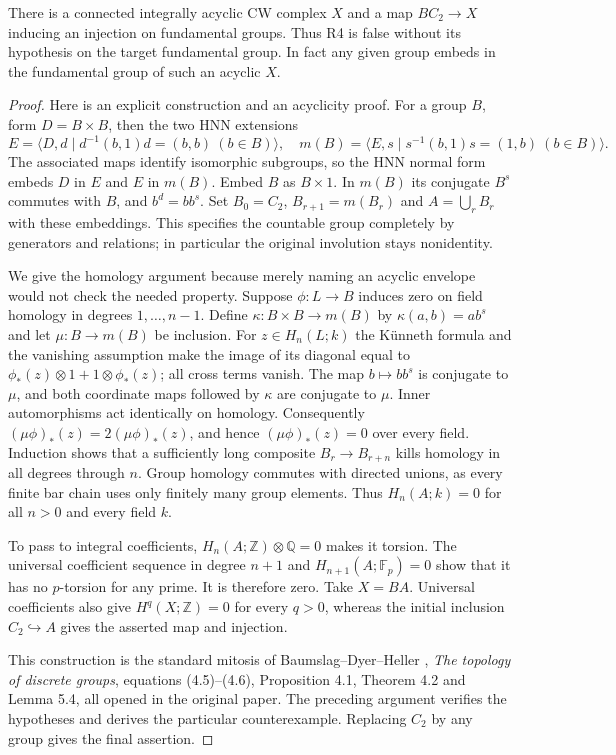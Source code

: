 \begin{theorem}\label{A:acyclic}
There is a connected integrally acyclic CW complex $X$ and a map
$BC_2\to X$ inducing an injection on fundamental groups. Thus R4 is false
without its hypothesis on the target fundamental group. In fact any given
group embeds in the fundamental group of such an acyclic $X$.
\end{theorem}
\begin{proof}
Here is an explicit construction and an acyclicity proof. For a group $B$,
form $D=B\times B$, then the two HNN extensions
\[
 E=\langle D,d\mid d^{-1}(b,1)d=(b,b)\ (b\in B)\rangle,
\quad
 m(B)=\langle E,s\mid s^{-1}(b,1)s=(1,b)\ (b\in B)\rangle.
\]
The associated maps identify isomorphic subgroups, so the HNN normal form
embeds $D$ in $E$ and $E$ in $m(B)$. Embed $B$ as $B\times1$. In $m(B)$ its
conjugate $B^s$ commutes with $B$, and $b^d=bb^s$. Set
$B_0=C_2$, $B_{r+1}=m(B_r)$ and $A=\bigcup_r B_r$ with these embeddings.
This specifies the countable group completely by generators and relations;
in particular the original involution stays nonidentity.

We give the homology argument because merely naming an acyclic envelope
would not check the needed property. Suppose $\phi:L\to B$ induces zero on
field homology in degrees $1,\ldots,n-1$. Define
$\kappa:B\times B\to m(B)$ by $\kappa(a,b)=ab^s$ and let
$\mu:B\to m(B)$ be inclusion. For $z\in H_n(L;k)$ the K\"unneth formula
and the vanishing assumption make the image of its diagonal equal to
$\phi_*(z)\otimes1+1\otimes\phi_*(z)$; all cross terms vanish.
The map $b\mapsto bb^s$ is conjugate to $\mu$, and both coordinate maps
followed by $\kappa$ are conjugate to $\mu$. Inner automorphisms act
identically on homology. Consequently
$(\mu\phi)_*(z)=2(\mu\phi)_*(z)$, and hence $(\mu\phi)_*(z)=0$ over every
field. Induction shows that a sufficiently long composite
$B_r\to B_{r+n}$ kills homology in all degrees through $n$.
Group homology commutes with directed unions, as every finite bar chain
uses only finitely many group elements. Thus $H_n(A;k)=0$ for all $n>0$
and every field $k$.

To pass to integral coefficients, $H_n(A;\mathbb Z)\otimes\mathbb Q=0$
makes it torsion. The universal coefficient sequence in degree $n+1$ and
$H_{n+1}(A;\mathbb F_p)=0$ show that it has no $p$-torsion for any prime.
It is therefore zero. Take $X=BA$. Universal coefficients also give
$H^q(X;\mathbb Z)=0$ for every $q>0$, whereas the initial inclusion
$C_2\hookrightarrow A$ gives the asserted map and injection.

This construction is the standard mitosis of Baumslag--Dyer--Heller \cite{baumslagdyerheller1980},
\emph{The topology of discrete groups}, equations (4.5)--(4.6),
Proposition 4.1, Theorem 4.2 and Lemma 5.4, all opened in the original paper.
The preceding argument verifies the hypotheses and derives the particular
counterexample. Replacing $C_2$ by any group gives the final assertion.
\end{proof}

